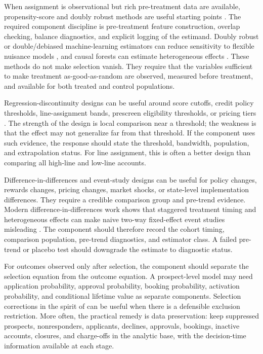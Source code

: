 \documentclass[11pt]{article}
\newcommand{\1}{\mathbf{1}}
\begin{document}
When assignment is observational but rich pre-treatment data are available,
propensity-score and doubly robust methods are useful starting points
\citep{rosenbaum1983propensity,imbenswooldridge2009recent}. The required
component discipline is pre-treatment feature construction, overlap checking,
balance diagnostics, and explicit logging of the estimand. Doubly robust or
double/debiased machine-learning estimators can reduce sensitivity to flexible
nuisance models \citep{chernozhukov2018dml}, and causal forests can estimate
heterogeneous effects \citep{wager2018causalforests}. These methods do not make
selection vanish. They require that the variables sufficient to make treatment
as-good-as-random are observed, measured before treatment, and available for
both treated and control populations.

Regression-discontinuity designs can be useful around score cutoffs, credit
policy thresholds, line-assignment bands, prescreen eligibility thresholds, or
pricing tiers \citep{lee2010rd}. The strength of the design is local
comparison near a threshold; the weakness is that the effect may not generalize
far from that threshold. If the component uses such evidence, the response
should state the threshold, bandwidth, population, and extrapolation status.
For line assignment, this is often a better design than comparing all high-line
and low-line accounts.

Difference-in-differences and event-study designs can be useful for policy
changes, rewards changes, pricing changes, market shocks, or state-level
implementation differences. They require a credible comparison group and
pre-trend evidence. Modern difference-in-differences work shows that staggered
treatment timing and heterogeneous effects can make naive two-way fixed-effect
event studies misleading \citep{callaway2021did,sun2021eventstudy}. The
component should therefore record the cohort timing, comparison population,
pre-trend diagnostics, and estimator class. A failed pre-trend or placebo test
should downgrade the estimate to diagnostic status.

For outcomes observed only after selection, the component should separate the
selection equation from the outcome equation. A prospect-level model may need
application probability, approval probability, booking probability, activation
probability, and conditional lifetime value as separate components. Selection
corrections in the spirit of \citet{heckman1979selection} can be useful when
there is a defensible exclusion restriction. More often, the practical remedy
is data preservation: keep suppressed prospects, nonresponders, applicants,
declines, approvals, bookings, inactive accounts, closures, and charge-offs in
the analytic base, with the decision-time information available at each stage.
\end{document}
